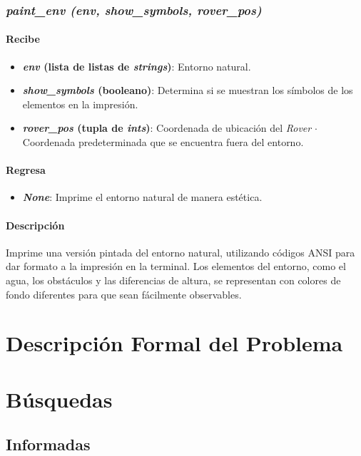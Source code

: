 \documentclass[12pt, letterpaper]{article}
\begin{document}
        \subsubsection{\textit{paint\_env (env, show\_symbols, rover\_pos)}}
            \paragraph{Recibe}
                \begin{itemize}
                    \item \textbf{\textit{env} (lista de listas de \textit{strings})}: Entorno natural.
                    \item \textbf{\textit{show\_symbols} (booleano)}: Determina si se muestran los símbolos de los elementos en la impresión.
                    \item \textbf{\textit{rover\_pos} (tupla de \textit{ints})}: Coordenada de ubicación del \textit{Rover} $\cdot$  Coordenada predeterminada que se encuentra fuera del entorno.
                \end{itemize}
            \paragraph{Regresa}
                \begin{itemize}
                    \item \textbf{\textit{None}}: Imprime el entorno natural de manera estética.
                \end{itemize}
            \paragraph{Descripción}
                Imprime una versión pintada del entorno natural, utilizando códigos ANSI para dar formato a la impresión en la terminal. Los elementos del entorno, como el agua, los obstáculos y las diferencias de altura, se representan con colores de fondo diferentes para que sean fácilmente observables.
\section{Descripción Formal del Problema}

\section{Búsquedas}

    \subsection{Informadas}
\end{document}
